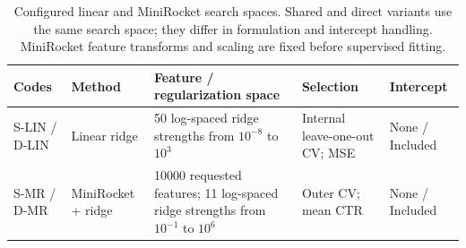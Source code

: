 \begin{table}[tbp]
\centering
\footnotesize
\begin{tabularx}{\textwidth}{@{}p{}p{}Xp{}p{}@{}}
\toprule
Codes & Method & Feature / regularization space & Selection & Intercept \\
\midrule
S-LIN / D-LIN
& Linear ridge
& 50 log-spaced ridge strengths from $10^{-8}$ to $10^{3}$
& Internal leave-one-out CV; MSE
& None / Included \\

S-MR / D-MR
& MiniRocket + ridge
& 10000 requested features; 11 log-spaced ridge strengths from $10^{-1}$ to $10^{6}$
& Outer CV; mean CTR
& None / Included \\
\bottomrule
\end{tabularx}
\caption{Configured linear and MiniRocket search spaces. Shared and direct
variants use the same search space; they differ in formulation and intercept
handling. MiniRocket feature transforms and scaling are fixed before supervised
fitting.}
\label{tab:space-ridge-minirocket-summary}
\end{table}